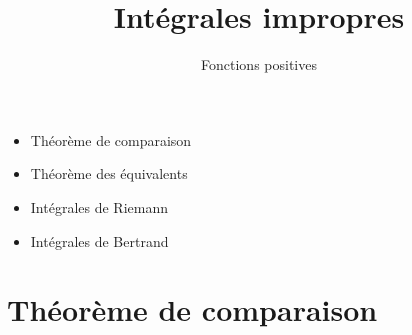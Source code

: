 







\title{{\bf Intégrales impropres}}
\subtitle{Fonctions positives}

\begin{frame}
  
  \debutmontitre

  \pause

{\footnotesize
\hfill
{}
\begin{minipage}{0.6\textwidth}
  \begin{itemize}
    \item<3-> Théorème de comparaison
    \item<4-> Théorème des équivalents
    \item<5-> Intégrales de Riemann
    \item<6-> Intégrales de Bertrand    
      \end{itemize}
\end{minipage}
}

\end{frame}

\setcounter{framenumber}{0}

\section*{Théorème de comparaison}

